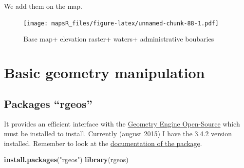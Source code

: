 \documentclass[]{report}
\newenvironment{Shaded}{\begin{snugshade}}{\end{snugshade}}
\newcommand{\DataTypeTok}[1]{\textcolor[rgb]{0.13,0.29,0.53}{#1}}
\newcommand{\KeywordTok}[1]{\textcolor[rgb]{0.13,0.29,0.53}{\textbf{#1}}}
\newcommand{\NormalTok}[1]{#1}
\newcommand{\OtherTok}[1]{\textcolor[rgb]{0.56,0.35,0.01}{#1}}
\newcommand{\StringTok}[1]{\textcolor[rgb]{0.31,0.60,0.02}{#1}}
\begin{document}
We add them on the map.

\begin{Shaded}
\end{Shaded}

\begin{figure}
\centering
\texttt{[image: mapsR\_files/figure-latex/unnamed-chunk-88-1.pdf]}
\caption{Base map+ elevation raster+ waters+ administrative boubaries}
\end{figure}

\hypertarget{basic-geometry-manipulation}{%
\chapter{Basic geometry
manipulation}\label{basic-geometry-manipulation}}

\hypertarget{packages-rgeos}{%
\section{Packages ``rgeos''}\label{packages-rgeos}}

It provides an efficient interface with the
\href{http://trac.osgeo.org/geos/}{Geometry Engine Open-Source} which
must be installed to install. Currently (august 2015) I have the 3.4.2
version installed. Remember to look at the
\href{http://cran.r-project.org/web/packages/rgeos/rgeos.pdf}{documentation
of the package}.

\begin{Shaded}
\begin{Highlighting}[]
\KeywordTok{install.packages}\NormalTok{(}\StringTok{"rgeos"}\NormalTok{)}
\KeywordTok{library}\NormalTok{(rgeos)}
\end{Highlighting}
\end{Shaded}
\end{document}

